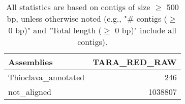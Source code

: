 \documentclass[12pt,a4paper]{article}
\begin{document}
\begin{table}[ht]
\begin{center}
\caption{All statistics are based on contigs of size $\geq$ 500 bp, unless otherwise noted (e.g., "\# contigs ($\geq$ 0 bp)" and "Total length ($\geq$ 0 bp)" include all contigs).}
\begin{tabular}{|l*{1}{|r}|}
\hline
Assemblies & TARA\_RED\_RAW \\ \hline
Thioclava\_annotated & 246 \\ \hline
not\_aligned & 1038807 \\ \hline
\end{tabular}
\end{center}
\end{table}
\end{document}
